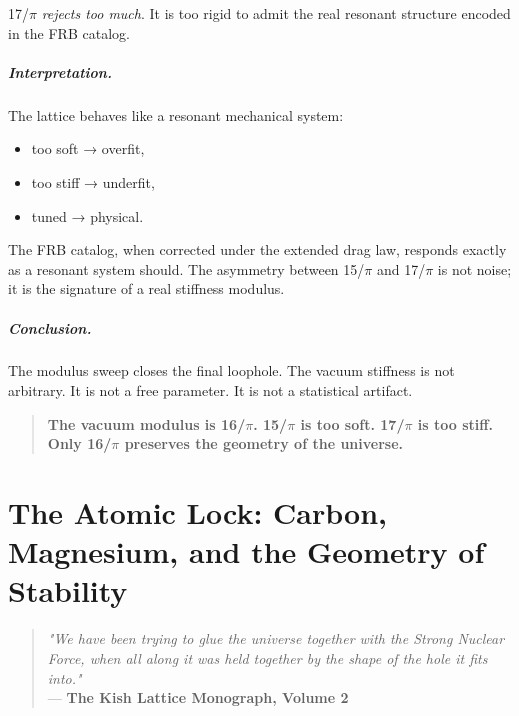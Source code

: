 \documentclass[11pt, letterpaper, openany]{book}
\begin{document}
17/$\pi$ \emph{rejects too much}.  
It is too rigid to admit the real resonant structure encoded in the FRB catalog.

\paragraph{Interpretation.}

The lattice behaves like a resonant mechanical system:

\begin{itemize}
    \item too soft → overfit,
    \item too stiff → underfit,
    \item tuned → physical.
\end{itemize}

The FRB catalog, when corrected under the extended drag law, responds exactly as a resonant
system should. The asymmetry between 15/$\pi$ and 17/$\pi$ is not noise; it is the signature of a
real stiffness modulus.

\paragraph{Conclusion.}

The modulus sweep closes the final loophole.  
The vacuum stiffness is not arbitrary.  
It is not a free parameter.  
It is not a statistical artifact.

\begin{quote}
\textbf{The vacuum modulus is 16/$\pi$.  
15/$\pi$ is too soft.  
17/$\pi$ is too stiff.  
Only 16/$\pi$ preserves the geometry of the universe.}
\end{quote}



\chapter{The Atomic Lock: Carbon, Magnesium, and the Geometry of Stability}
\label{chap:atomic_lock}

\begin{quote}
\textit{"We have been trying to glue the universe together with the Strong Nuclear Force, when all along it was held together by the shape of the hole it fits into."} \\
--- \textbf{The Kish Lattice Monograph, Volume 2}
\end{quote}
\end{document}
